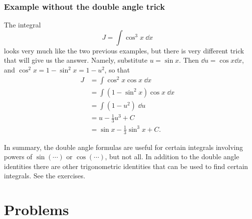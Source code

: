 \subsubsection{Example without the double angle trick}
The integral
\[
J=\int \cos ^3 x\;\dd x
\]
looks very much like the two previous examples, but there is very different
trick that will give us the answer.  Namely, substitute $u=\sin x$.  Then $\dd u
= \cos x \dd x$, and $\cos^2x = 1-\sin^2 x = 1-u^2$, so that
\begin{align*}
  J &= \int \cos^2 x \cos x\;\dd x \\
  &= \int (1-\sin^2 x) \cos x\;\dd x\\
  &= \int (1-u^2)\;\dd u\\
  &= u - \frac13u^3 +C \\
  &= \sin x - \frac13\sin^3 x +C.
\end{align*}

In summary, the double angle formulas are useful for certain integrals involving
powers of $\sin(\cdots)$ or $\cos(\cdots)$, but not all.  In addition to the
double angle identities there are other trigonometric identities that can be
used to find certain integrals.  See the exercises.

\section{Problems} %

\problemfont %

